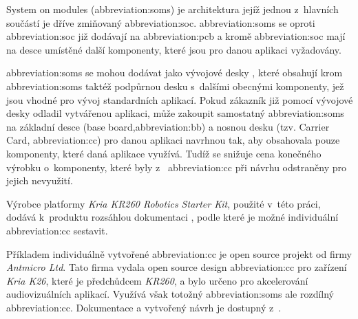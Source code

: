 \documentclass[a4paper, twoside, 11pt]{article}
\begin{document}
	System on modules (\gls{abbreviation:soms}) je architektura jejíž jednou z~hlavních součástí je dříve zmiňovaný \gls{abbreviation:soc}. \gls{abbreviation:soms} se oproti \gls{abbreviation:soc} již dodávají na \gls{abbreviation:pcb} a kromě \gls{abbreviation:soc} mají na desce umístěné další komponenty, které jsou pro danou aplikaci vyžadovány. \cite{xilinx-what-is-a-som}\par
	\gls{abbreviation:soms} se mohou dodávat jako vývojové desky \cite{xilinx-kria-kr260-robotics-starter-kit}, které obsahují krom \gls{abbreviation:soms} taktéž podpůrnou desku s~dalšími obecnými komponenty, jež jsou vhodné pro vývoj standardních aplikací. Pokud zákazník již pomocí vývojové desky odladil vytvářenou aplikaci, může zakoupit samostatný \gls{abbreviation:soms} na základní desce (base board,\gls{abbreviation:bb}) a nosnou desku (tzv. Carrier Card, \gls{abbreviation:cc}) pro danou aplikaci navrhnou tak, aby obsahovala pouze komponenty, které daná aplikace využívá. Tudíž se snižuje cena konečného výrobku o~komponenty, které byly z~ \gls{abbreviation:cc} při návrhu odstraněny pro jejich nevyužití.\par
	Výrobce platformy \textit{Kria KR260 Robotics Starter Kit}, použité v~této práci, dodává k~produktu rozsáhlou dokumentaci \cite{kria-som-carrier-card-design-guide-2022} \cite{kria-k26-som-ds}, podle které je možné individuální \gls{abbreviation:cc} sestavit. \par
	Příkladem individuálně vytvořené \gls{abbreviation:cc} je open source projekt od firmy \textit{Antmicro Ltd}. Tato firma vydala open source design \gls{abbreviation:cc} pro zařízení \textit{Kria K26}, které je předchůdcem \textit{KR260}, a bylo určeno pro akcelerování audiovizuálních aplikací. Využívá však totožný \gls{abbreviation:soms} ale rozdílný \gls{abbreviation:cc}. Dokumentace a vytvořený návrh je dostupný z~\cite{antmicro-open-source-kria-k26-carrier-card}.
\end{document}
